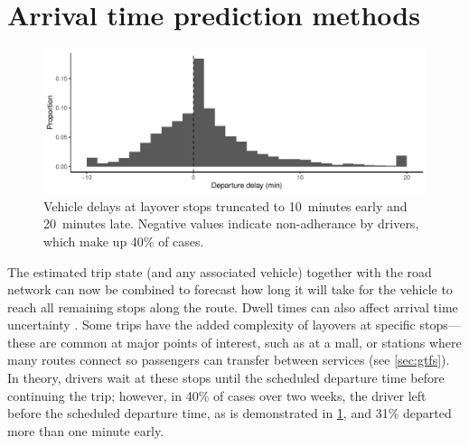 \section{Arrival time prediction methods}
\label{sec:prediction_arrival_time}




\begin{knitrout}\small
{}\color{fgcolor}\begin{figure}

{\centering \includegraphics[width=\linewidth]{figure/layover_observance-1} 

}

\caption[Vehicle delays at layover stops]{Vehicle delays at layover stops truncated to 10~minutes early and 20~minutes late. Negative values indicate non-adherance by drivers, which make up 40\% of cases.}\label{fig:layover_observance}
\end{figure}


\end{knitrout}

The estimated trip state (and any associated vehicle) together with the road network can now be combined to forecast how long it will take for the vehicle to reach all remaining stops along the route. Dwell times can also affect arrival time uncertainty \citep{Shen_2013,Wang_2016,Robinson_2013,Meng_2013,Shalaby_2004,Hans_2015}. Some trips have the added complexity of layovers at specific stops---these are common at major points of interest, such as at a mall, or stations where many routes connect so passengers can transfer between services (see \cref{sec:gtfs}). In theory, drivers wait at these stops until the scheduled departure time before continuing the trip; however, in 40\% of cases over two weeks, the driver left before the scheduled departure time, as is demonstrated in \cref{fig:layover_observance}, and 31\% departed more than one minute early.



